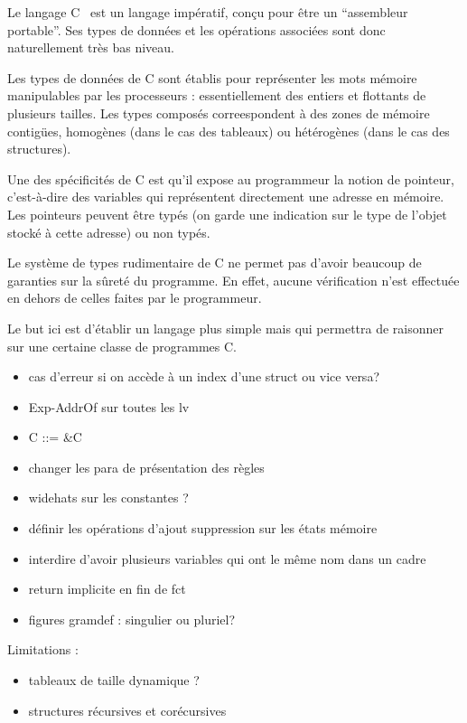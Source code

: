 
Le langage C~\cite{KandR} est un langage impératif, conçu pour être un
``assembleur portable''. Ses types de données et les opérations associées sont
donc naturellement très bas niveau.

Les types de données de C sont établis pour représenter les mots mémoire
manipulables par les processeurs : essentiellement des entiers et flottants de
plusieurs tailles. Les types composés correespondent à des zones de mémoire
contigües, homogènes (dans le cas des tableaux) ou hétérogènes (dans le cas des
structures).

Une des spécificités de C est qu'il expose au programmeur la notion de pointeur,
c'est-à-dire des variables qui représentent directement une adresse en mémoire.
Les pointeurs peuvent être typés (on garde une indication sur le type de l'objet
stocké à cette adresse) ou non typés.

Le système de types rudimentaire de C ne permet pas d'avoir beaucoup de
garanties sur la sûreté du programme. En effet, aucune vérification n'est
effectuée en dehors de celles faites par le programmeur.

Le but ici est d'établir un langage plus simple mais qui permettra de raisonner
sur une certaine classe de programmes C.


\begin{itemize}
\item cas d'erreur si on accède à un index d'une struct ou vice versa?
\item Exp-AddrOf sur toutes les lv
\item C ::= \&C
\item changer les para de présentation des règles
\item widehats sur les constantes ?
\item définir les opérations d'ajout suppression sur les états mémoire
\item interdire d'avoir plusieurs variables qui ont le même nom dans un cadre
\item return implicite en fin de fct
\item figures gramdef : singulier ou pluriel?
\end{itemize}

Limitations :

\begin{itemize}
\item tableaux de taille dynamique ?
\item structures récursives et corécursives
\end{itemize}

